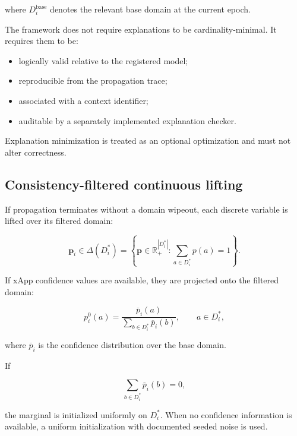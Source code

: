 \documentclass[pdflatex,sn-mathphys-num,iicol,oneside]{sn-jnl}
\begin{document}
where $D_i^{\mathrm{base}}$ denotes the relevant base domain at the
current epoch.

The framework does not require explanations to be
cardinality-minimal. It requires them to be:

\begin{itemize}
    \item logically valid relative to the registered model;
    \item reproducible from the propagation trace;
    \item associated with a context identifier;
    \item auditable by a separately implemented explanation checker.
\end{itemize}

Explanation minimization is treated as an optional optimization and
must not alter correctness.

\subsection{Consistency-filtered continuous lifting}

If propagation terminates without a domain wipeout, each discrete
variable is lifted over its filtered domain:

\begin{equation}
\bm{p}_i
\in
\Delta(D_i^{*})
=
\left\{
\bm{p}\in\mathbb{R}_{+}^{|D_i^{*}|}:
\sum_{a\in D_i^{*}}p(a)=1
\right\}.
\end{equation}

If xApp confidence values are available, they are projected onto the
filtered domain:

\begin{equation}
p_i^{0}(a)
=
\frac{\overline{p}_i(a)}
{\displaystyle
\sum_{b\in D_i^{*}}\overline{p}_i(b)},
\qquad
a\in D_i^{*},
\label{eq:projected-initialization}
\end{equation}

where $\overline{p}_i$ is the confidence distribution over the base
domain.

If

\begin{equation}
\sum_{b\in D_i^{*}}\overline{p}_i(b)=0,
\end{equation}

the marginal is initialized uniformly on $D_i^{*}$. When no
confidence information is available, a uniform initialization with
documented seeded noise is used.
\end{document}
